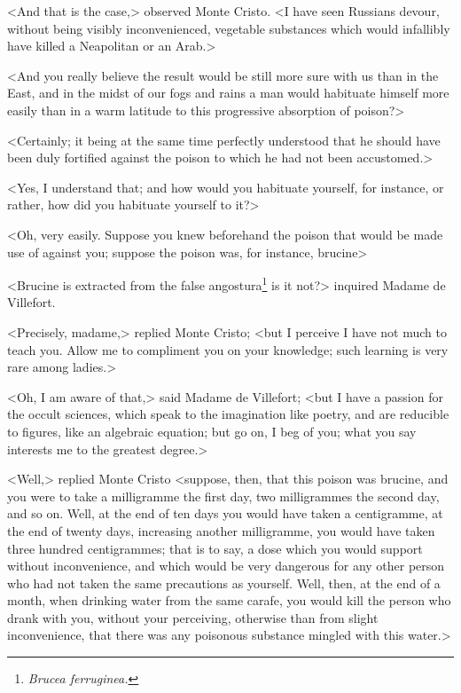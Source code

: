  <And that is the case,> observed Monte Cristo. <I have seen Russians devour, without being visibly inconvenienced, vegetable substances which would infallibly have killed a Neapolitan or an Arab.> 

 <And you really believe the result would be still more sure with us than in the East, and in the midst of our fogs and rains a man would habituate himself more easily than in a warm latitude to this progressive absorption of poison?> 

 <Certainly; it being at the same time perfectly understood that he should have been duly fortified against the poison to which he had not been accustomed.> 

 <Yes, I understand that; and how would you habituate yourself, for instance, or rather, how did you habituate yourself to it?> 

 <Oh, very easily. Suppose you knew beforehand the poison that would be made use of against you; suppose the poison was, for instance, brucine\longdash> 

 <Brucine is extracted from the false angostura\footnote{\itshape Brucea ferruginea.} is it not?> inquired Madame de Villefort. 

 <Precisely, madame,> replied Monte Cristo; <but I perceive I have not much to teach you. Allow me to compliment you on your knowledge; such learning is very rare among ladies.> 

 <Oh, I am aware of that,> said Madame de Villefort; <but I have a passion for the occult sciences, which speak to the imagination like poetry, and are reducible to figures, like an algebraic equation; but go on, I beg of you; what you say interests me to the greatest degree.>  
 
 <Well,> replied Monte Cristo <suppose, then, that this poison was brucine, and you were to take a milligramme the first day, two milligrammes the second day, and so on. Well, at the end of ten days you would have taken a centigramme, at the end of twenty days, increasing another milligramme, you would have taken three hundred centigrammes; that is to say, a dose which you would support without inconvenience, and which would be very dangerous for any other person who had not taken the same precautions as yourself. Well, then, at the end of a month, when drinking water from the same carafe, you would kill the person who drank with you, without your perceiving, otherwise than from slight inconvenience, that there was any poisonous substance mingled with this water.> 

